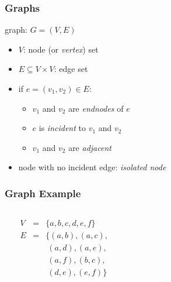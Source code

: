 \documentclass[dvipsnames]{beamer}
\begin{document}
\begin{frame}
  \frametitle{Graphs}

  \begin{definition}
    \alert{graph}: $G=(V,E)$

    \begin{itemize}
      \item $V$: \alert{node} (or \emph{vertex}) set
      \item $E \subseteq V \times V$: \alert{edge} set
    \end{itemize}
  \end{definition}

  \pause
  \begin{itemize}
    \item if $e=(v_1,v_2) \in E$:
    \begin{itemize}
      \item $v_1$ and $v_2$ are \emph{endnodes} of $e$
      \item $e$ is \emph{incident} to $v_1$ and $v_2$
      \item $v_1$ and $v_2$ are \emph{adjacent}
    \end{itemize}

    \pause
    \item node with no incident edge: \emph{isolated node}
  \end{itemize}
\end{frame}

\begin{frame}
  \frametitle{Graph Example}

  \begin{example}
    \begin{columns}
      \begin{center}
      \end{center}

      \pause
      $\begin{array}{lcl}
        V & = & \{a,b,c,d,e,f\}\\
        E & = & \{(a,b),(a,c),\\
          &   & ~(a,d),(a,e),\\
          &   & ~(a,f),(b,c),\\
          &   & ~(d,e),(e,f)\}
      \end{array}$
    \end{columns}
  \end{example}
\end{frame}
\end{document}
